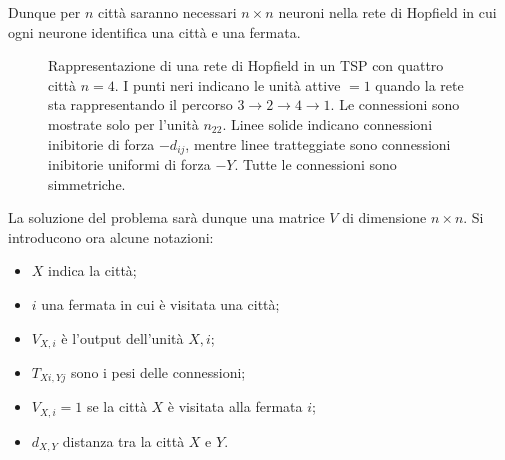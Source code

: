 Dunque per $n$ città saranno necessari $n \times n$ neuroni nella rete di Hopfield in cui ogni neurone identifica una città e una fermata.

\newpage

\begin{figure}[h!]
    \centering
    \caption{Rappresentazione di una rete di Hopfield in un TSP con quattro città $n=4$. I punti neri indicano le unità attive $=1$ quando la rete sta rappresentando il percorso $3 \rightarrow 2 \rightarrow 4 \rightarrow 1$. Le connessioni sono mostrate solo per l'unità $n_{22}$. Linee solide indicano connessioni inibitorie di forza $- d_{ij}$, mentre linee tratteggiate sono connessioni inibitorie uniformi di forza $-Y$. Tutte le connessioni sono simmetriche.} 
\end{figure}

La soluzione del problema sarà dunque una matrice $V$ di dimensione $n \times n$. Si introducono ora alcune notazioni:
\begin{itemize}
    \item $X$ indica la città;
    \item $i$ una fermata in cui è visitata una città;
    \item $V_{X,i}$ è l'output dell'unità $X, i$;
    \item $T_{Xi, Yj}$ sono i pesi delle connessioni;
    \item $V_{X,i} = 1$ se la città $X$ è visitata alla fermata $i$;
    \item $d_{X,Y}$ distanza tra la città $X$ e $Y$.
\end{itemize}

